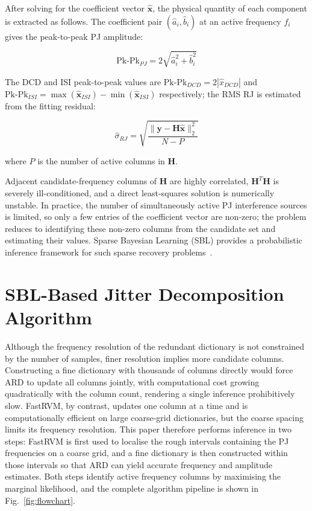 \documentclass[10pt, a4paper, twocolumn]{article}
\begin{document}
After solving for the coefficient vector $\hat{\mathbf{x}}$, the physical quantity of each component is extracted as follows. The coefficient pair $(\hat{a}_i, \hat{b}_i)$ at an active frequency $f_i$ gives the peak-to-peak PJ amplitude:

\begin{equation}
\mathrm{Pk\text{-}Pk}_{PJ} = 2\sqrt{\hat{a}_i^2 + \hat{b}_i^2} \tag{6}
\end{equation}

The DCD and ISI peak-to-peak values are $\mathrm{Pk\text{-}Pk}_{DCD} = 2|\hat{x}_{DCD}|$ and $\mathrm{Pk\text{-}Pk}_{ISI} = \max(\hat{\mathbf{x}}_{ISI}) - \min(\hat{\mathbf{x}}_{ISI})$ respectively; the RMS RJ is estimated from the fitting residual:

\begin{equation}
\hat{\sigma}_{RJ} = \sqrt{\frac{\|\mathbf{y} - \mathbf{H}\hat{\mathbf{x}}\|_2^2}{N - P}} \tag{7}
\end{equation}

where $P$ is the number of active columns in $\mathbf{H}$.

Adjacent candidate-frequency columns of $\mathbf{H}$ are highly correlated, $\mathbf{H}^T\mathbf{H}$ is severely ill-conditioned, and a direct least-squares solution is numerically unstable. In practice, the number of simultaneously active PJ interference sources is limited, so only a few entries of the coefficient vector are non-zero; the problem reduces to identifying these non-zero columns from the candidate set and estimating their values. Sparse Bayesian Learning (SBL) provides a probabilistic inference framework for such sparse recovery problems~\cite{tipping_sparse_2001}.


\section{SBL-Based Jitter Decomposition Algorithm}

Although the frequency resolution of the redundant dictionary is not constrained by the number of samples, finer resolution implies more candidate columns. Constructing a fine dictionary with thousands of columns directly would force ARD to update all columns jointly, with computational cost growing quadratically with the column count, rendering a single inference prohibitively slow. FastRVM, by contrast, updates one column at a time and is computationally efficient on large coarse-grid dictionaries, but the coarse spacing limits its frequency resolution. This paper therefore performs inference in two steps: FastRVM is first used to localise the rough intervals containing the PJ frequencies on a coarse grid, and a fine dictionary is then constructed within those intervals so that ARD can yield accurate frequency and amplitude estimates. Both steps identify active frequency columns by maximising the marginal likelihood, and the complete algorithm pipeline is shown in Fig.~\ref{fig:flowchart}.
\end{document}

